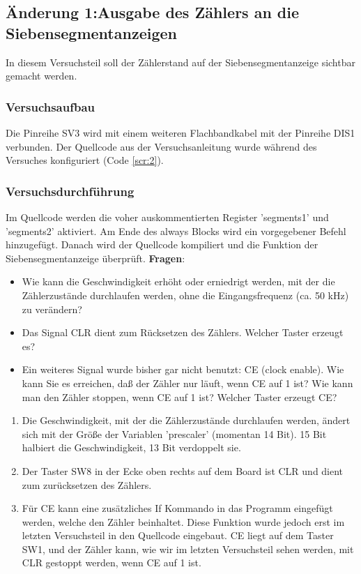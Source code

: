 \documentclass[12pt,a4paper]{article}
\begin{document}
\subsection{Änderung 1:Ausgabe des Zählers an die Siebensegmentanzeigen}
In diesem Versuchsteil soll der Zählerstand auf der Siebensegmentanzeige sichtbar gemacht werden.
\subsubsection*{Versuchsaufbau}
Die Pinreihe SV3 wird mit einem weiteren Flachbandkabel mit der Pinreihe DIS1 verbunden.
Der Quellcode aus der Versuchsanleitung wurde während des Versuches konfiguriert (Code \ref{scr:2}).
\subsubsection*{Versuchsdurchführung}
Im Quellcode werden die voher auskommentierten Register 'segments1' und 'segments2' aktiviert. Am Ende des always Blocks wird ein vorgegebener Befehl hinzugefügt. Danach wird der Quellcode kompiliert und die Funktion der Siebensegmentanzeige überprüft.
\textbf{Fragen}:
\begin{itemize}
\item Wie kann die Geschwindigkeit erhöht oder erniedrigt werden, mit der die Zählerzustände durchlaufen werden, ohne die Eingangsfrequenz (ca. 50 kHz) zu verändern?
\item Das Signal CLR dient zum Rücksetzen des Zählers. Welcher Taster erzeugt es?
\item Ein weiteres Signal wurde bisher gar nicht benutzt: CE (clock enable). Wie kann Sie es erreichen, daß der Zähler nur läuft, wenn CE auf 1 ist? Wie kann man den Zähler stoppen, wenn CE auf 1 ist? Welcher Taster erzeugt CE?
\end{itemize} 
\begin{enumerate}
\item Die Geschwindigkeit, mit der die Zählerzustände durchlaufen werden, ändert sich mit der Größe der Variablen 'prescaler' (momentan 14 Bit). 15 Bit halbiert die Geschwindigkeit, 13 Bit verdoppelt sie.
\item Der Taster SW8 in der Ecke oben rechts auf dem Board ist CLR und dient zum zurücksetzen des Zählers.
\item Für CE kann eine zusätzliches If Kommando in das Programm eingefügt werden, welche den Zähler beinhaltet. Diese Funktion wurde jedoch erst im letzten Versuchsteil in den Quellcode eingebaut. CE liegt auf dem Taster SW1, und der Zähler kann, wie wir im letzten Versuchsteil sehen werden, mit CLR gestoppt werden, wenn CE auf 1 ist.
\end{enumerate}
\end{document}

